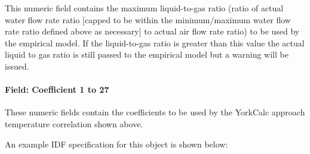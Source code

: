 This numeric field contains the maximum liquid-to-gas ratio (ratio of actual water flow rate ratio {[}capped to be within the minimum/maximum water flow rate ratio defined above as necessary{]} to actual air flow rate ratio) to be used by the empirical model. If the liquid-to-gas ratio is greater than this value the actual liquid to gas ratio is still passed to the empirical model but a warning will be issued.

\paragraph{Field: Coefficient 1 to 27}\label{field-coefficient-1-to-27}

These numeric fields contain the coefficients to be used by the YorkCalc approach temperature correlation shown above.

An example IDF specification for this object is shown below:

